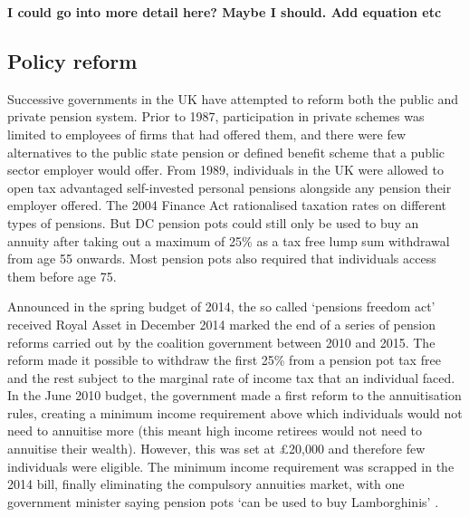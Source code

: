 \documentclass[12pt]{article}
\begin{document}
\textbf{I could go into more detail here? Maybe I should. Add equation etc}


\subsection{Policy reform}

Successive governments in the UK have attempted to reform both the public and private pension system. Prior
to 1987, participation in private schemes was limited to employees of firms that had offered them, and there
were few alternatives to the public state pension or defined benefit scheme that a public sector employer
would offer. From 1989, individuals in the UK were allowed to open tax advantaged self-invested personal pensions
alongside any pension their employer offered. The 2004 Finance Act rationalised taxation rates on different types of pensions.
But DC pension pots could still only be used to buy an annuity after taking out a maximum of 25\% as a tax free lump sum withdrawal
from age 55 onwards. Most pension pots also required that individuals access them before age 75.

Announced in the spring budget of 2014, the so called `pensions freedom act' received Royal Asset in December 2014 marked the end of a series
of pension reforms carried out by the coalition government between 2010 and 2015. The reform made it possible
to withdraw the first 25\% from a pension pot tax free and the rest subject to the marginal rate of income tax that an individual faced.
In the June 2010 budget, the government made a first reform to the annuitisation rules, creating
a minimum income requirement above which individuals would not need to
annuitise more \cite{finance_act_hmt_2011} (this meant high income retirees would not need to annuitise their wealth).
However, this was set at £20,000 and therefore few individuals
were eligible. The minimum income requirement was scrapped in the 2014 bill, finally eliminating the
compulsory annuities market, with one government minister saying pension pots `can be used to buy Lamborghinis'
\cite{guardian_lambos}.
\end{document}
